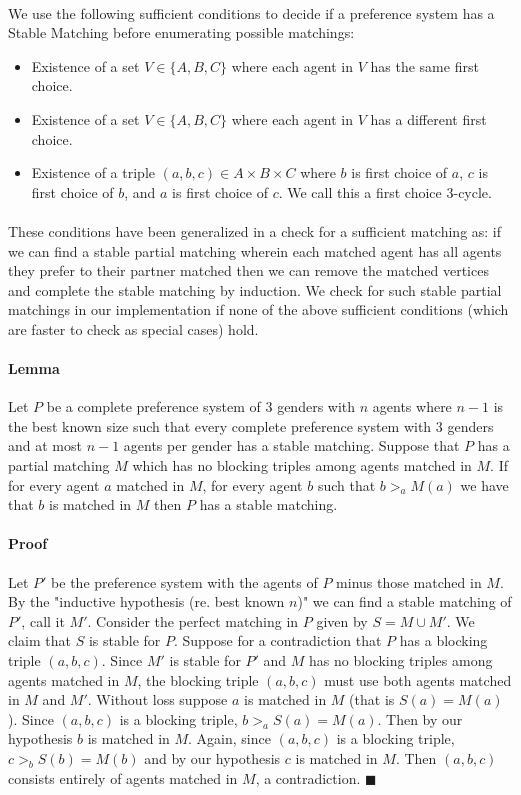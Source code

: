 \documentclass[letterpaper,12pt,oneside,onecolumn]{article}
\begin{document}
\paragraph{}
We use the following sufficient conditions to decide if a preference system has a Stable Matching before enumerating possible matchings:
\begin{itemize}
\item Existence of a set $V \in \{A,B,C\}$ where each agent in $V$ has the same first choice.
\item Existence of a set $V \in \{A,B,C\}$ where each agent in $V$ has a different first choice.
\item Existence of a triple $(a,b,c) \in A\times B\times C$ where $b$ is first choice of $a$, $c$ is first choice of $b$, and $a$ is first choice of $c$. We call this a first choice $3$-cycle.
\end{itemize}
\paragraph{}
These conditions have been generalized in a check for a sufficient matching as: if we can find a stable partial matching wherein each matched agent has all agents they prefer to their partner matched then we can remove the matched vertices and complete the stable matching by induction. We check for such stable partial matchings in our implementation if none of the above sufficient conditions (which are faster to check as special cases) hold.
\paragraph{Lemma}
Let $P$ be a complete preference system of $3$ genders with $n$ agents where $n-1$ is the best known size such that every complete preference system with $3$ genders and at most $n-1$ agents per gender has a stable matching. Suppose that $P$ has a partial matching $M$ which has no blocking triples among agents matched in $M$. If for every agent $a$ matched in $M$, for every agent $b$ such that $b >_a M(a)$ we have that $b$ is matched in $M$ then $P$ has a stable matching.
\paragraph{Proof}
Let $P'$ be the preference system with the agents of $P$ minus those matched in $M$. By the "inductive hypothesis (re. best known $n$)" we can find a stable matching of $P'$, call it $M'$. Consider the perfect matching in $P$ given by $S = M \cup M'$. We claim that $S$ is stable for $P$. Suppose for a contradiction that $P$ has a blocking triple $(a,b,c)$. Since $M'$ is stable for $P'$ and $M$ has no blocking triples among agents matched in $M$, the blocking triple $(a,b,c)$ must use both agents matched in $M$ and $M'$. Without loss suppose $a$ is matched in $M$ (that is $S(a) = M(a)$). Since $(a,b,c)$ is a blocking triple, $b >_a S(a) = M(a)$. Then by our hypothesis $b$ is matched in $M$. Again, since $(a,b,c)$ is a blocking triple, $c >_b S(b) = M(b)$ and by our hypothesis $c$ is matched in $M$. Then $(a,b,c)$ consists entirely of agents matched in $M$, a contradiction. $\blacksquare$
\end{document}

